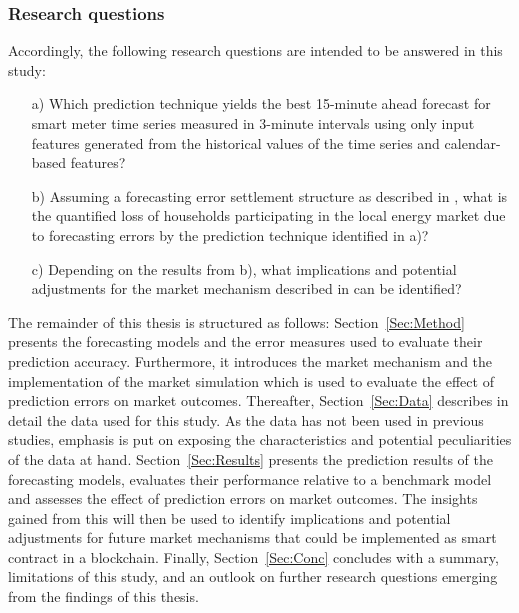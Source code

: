 \subsubsection{Research questions}
Accordingly, the following research questions are intended to be answered in this study:
\begin{itemize}
    \item[a)] Which prediction technique yields the best 15-minute ahead forecast  for smart meter time series measured in 3-minute intervals using only input features generated from the historical values of the time series and calendar-based features?
    \item[b)] Assuming a forecasting error settlement structure as described in \citet{Mengelkamp:2018a}, what is the quantified loss of households participating in the local energy market due to forecasting errors by the prediction technique identified in a)?
    \item[c)] Depending on the results from b), what implications and potential adjustments for the market mechanism described in \citet{Mengelkamp:2018a} can be identified?
\end{itemize}

The remainder of this thesis is structured as follows: Section~\ref{Sec:Method} presents the forecasting models and the error measures used to evaluate their prediction accuracy. Furthermore, it introduces the market mechanism and the implementation of the market simulation which is used to evaluate the effect of prediction errors on market outcomes. Thereafter, Section~\ref{Sec:Data} describes in detail the data used for this study. As the data has not been used in previous studies, emphasis is put on exposing the characteristics and potential peculiarities of the data at hand. Section~\ref{Sec:Results} presents the prediction results of the forecasting models, evaluates their performance relative to a benchmark model and assesses the effect of prediction errors on market outcomes. The insights gained from this will then be used to identify implications and potential adjustments for future market mechanisms that could be implemented as smart contract in a blockchain. Finally, Section~\ref{Sec:Conc} concludes with a summary, limitations of this study, and an outlook on further research questions emerging from the findings of this thesis.

